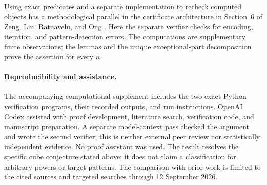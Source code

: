 \documentclass[11pt]{article}
\begin{document}
Using exact predicates and a separate implementation to recheck
computed objects has a methodological parallel in the certificate
architecture in Section~6 of Zeng, Liu, Ratnavelu, and Ong
\cite{ZengEtAl2026}. Here the separate verifier checks for
encoding, iteration, and pattern-detection errors. The computations
are supplementary finite observations; the lemmas and the unique
exceptional-part decomposition prove the assertion for every $n$.

\paragraph{Reproducibility and assistance.}
The accompanying computational supplement includes the two exact
Python verification programs, their recorded outputs, and run
instructions. OpenAI Codex assisted with proof development, literature
search, verification code, and manuscript preparation. A separate
model-context pass checked the argument and wrote the second verifier;
this is neither external peer review nor statistically independent
evidence. No proof assistant was used. The result resolves the specific
cube conjecture stated above; it does not claim a classification for
arbitrary powers or target patterns. The comparison with prior work is
limited to the cited sources and targeted searches through
12 September 2026.



\end{document}
